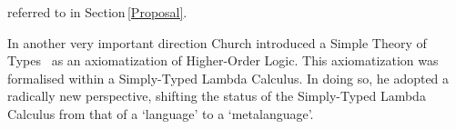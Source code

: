 \documentclass[11pt,twocolumn]{article}
\newcommand{\hide}[1]{}
\newcommand{\ie}{\emph{ie.}}
\newcommand{\cf}{\emph{cf.}}
\begin{document}
referred to in Section\,\ref{Proposal}.

In another very important direction Church introduced a Simple Theory of
Types~\cite{Church1940} 
as an axiomatization of Higher-Order Logic.
This axiomatization was formalised within a Simply-Typed Lambda Calculus.
In doing so, he adopted a radically new perspective, shifting the status
of the Simply-Typed Lambda Calculus from that of a `language' to a
`metalanguage'. %
\hide{
  When regarded as a metalanguage, the Simply-Typed
Lambda Calculus is considered as an equational theory. %
}

\hide{
The processes of abstracting from languages to metalanguages has become a
common activity in computer science, and plays an important role in our
proposed investigations.  
}
\end{document}
